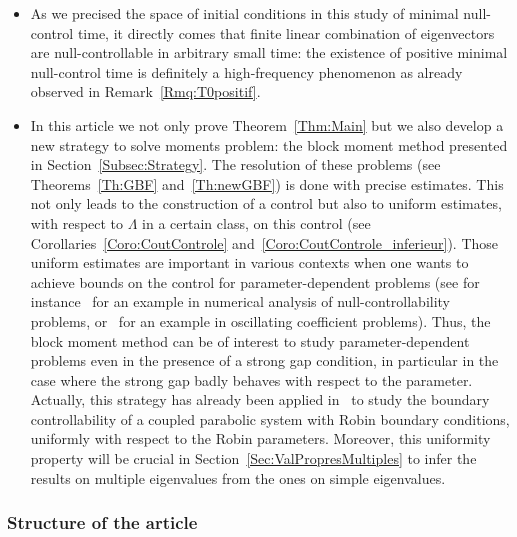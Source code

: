 \documentclass[10pt]{amsart}
\theoremstyle{definition}\newtheorem{defi}[theo]{Definition}\newtheorem{rema}[theo]{Remark}\newtheorem{exam}[theo]{Example}\newtheorem{exem}[theo]{Example}\newtheorem{nota}[theo]{Notation}
\newcommand{\R}{\mathbb{R}}
\begin{document}
\begin{itemize}
The restriction to the one dimensional case in those applications comes from the assumption~\eqref{SommabiliteVP}. Although this assumption can be seen as a restriction due to the use of moment method, as we are considering scalar controls\linebreak($U=\R$) it is also a necessary null-controllability condition (see for instance~\cite[Appendix A]{Miller06}).

\item As we precised the space of initial conditions in this study of minimal null-control time, it directly comes that finite linear combination of eigenvectors are null-controllable in arbitrary small time: the existence of positive minimal null-control time is definitely a high-frequency phenomenon as already observed in Remark~\ref{Rmq:T0positif}.

\item In this article we not only prove Theorem~\ref{Thm:Main} but we also develop a new strategy to solve moments problem: the block moment method presented in Section~\ref{Subsec:Strategy}. The resolution of these problems (see Theorems~\ref{Th:GBF} and~\ref{Th:newGBF}) is done with precise estimates. This not only leads to the construction of a control but also to uniform estimates, with respect to $\Lambda$ in a certain class, on this control (see Corollaries~\ref{Coro:CoutControle} and~\ref{Coro:CoutControle_inferieur}). Those uniform estimates are important in various contexts when one wants to achieve bounds on the control for parameter-dependent problems (see for instance~\cite{AB18,ABM_2018} for an example in numerical analysis of null-controllability problems, or~\cite{LopezZuazua:2002} for an example in oscillating coefficient problems). Thus, the block moment method can be of interest to study parameter-dependent problems even in the presence of a strong gap condition, in particular in the case where the strong gap badly behaves with respect to the parameter. Actually, this strategy has already been applied in~\cite{BoyerBhandari:2019} to study the boundary controllability of a coupled parabolic system with Robin boundary conditions, uniformly with respect to the Robin parameters. Moreover, this uniformity property will be crucial in Section~\ref{Sec:ValPropresMultiples} to infer the results on multiple eigenvalues from the ones on simple eigenvalues.
\end{itemize}



\subsubsection{Structure of the article}
\end{document}
